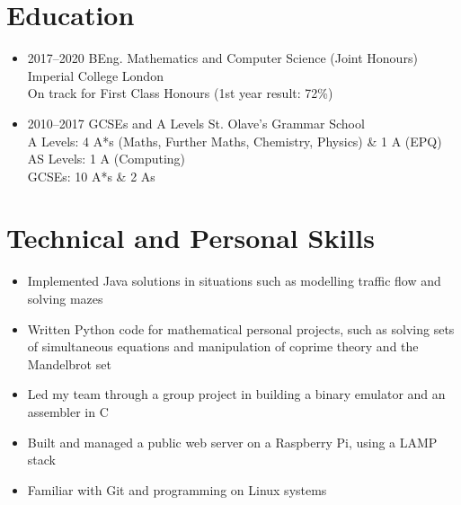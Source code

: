 \documentclass[11pt,a4paper,sans]{moderncv}        %
\begin{document}
\maketitle

\vspace{-40pt}

\section{Education}

\vspace{5pt}

\begin{itemize}

\item{
\cventry
{2017--2020}
{BEng. Mathematics and Computer Science (Joint Honours)}
{Imperial College London}
{}{}{
\noindent
\\
On track for First Class Honours (1st year result: 72\%)
}
} %

\item{
\cventry
{2010--2017}
{GCSEs and A Levels}
{St. Olave's Grammar School}
{}{}{
\noindent
\\
A Levels: 4 A*s (Maths, Further Maths, Chemistry, Physics) \& 1 A (EPQ)
\\
AS Levels: 1 A (Computing)
\\
GCSEs: 10 A*s \& 2 As
}}

\end{itemize}

\section{Technical and Personal Skills}

\begin{itemize}

\item Implemented Java solutions in situations such as modelling traffic flow and solving mazes
\item Written Python code for mathematical personal projects, such as solving sets of simultaneous equations and manipulation of coprime theory and the Mandelbrot set
\item Led my team through a group project in building a binary emulator and an assembler in C
\item Built and managed a public web server on a Raspberry Pi, using a LAMP stack
\item Familiar with Git and programming on Linux systems
\end{itemize}
\end{document}
